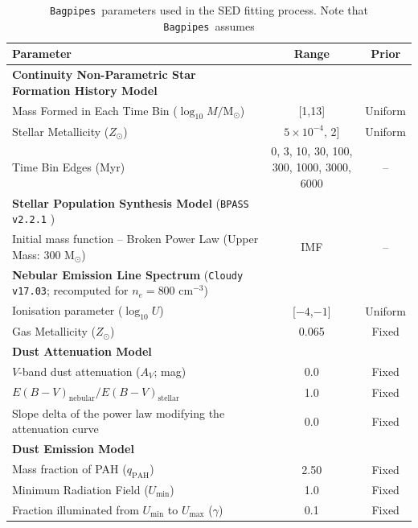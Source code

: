 \documentclass[twocolumn,tight,times,linenumbers]{aastex631}
\newcommand{\msol}{M$_\odot$}
\newcommand{\bagpipes}{\texttt{Bagpipes}}
\begin{document}
		\begin{table}
			\caption{\bagpipes~parameters used in the SED fitting process. Note that \bagpipes~assumes }
			\label{table:bagpipes}
			\centering
			\begin{tabular*}{\textwidth}{@{\extracolsep{\fill}}lcc}
				\hline
				Parameter & Range & Prior \\
				\hline
				\textbf{Continuity Non-Parametric Star Formation History Model} \citep{Leja2019} & & \\
				Mass Formed in Each Time Bin ($\log_{10} M/$M$_\odot$)  & [1,13] & Uniform\\
				Stellar Metallicity ($Z_\odot$)               &	 $5\times10^{-4}$, 2]    & 	Uniform \\
				Time Bin Edges (Myr) & 0, 3, 10, 30, 100, 300, 1000, 3000, 6000 & -- \\
				\hline
				\textbf{Stellar Population Synthesis Model} (\texttt{BPASS v2.2.1} \citealt{Stanway2018})       &                                        &  \\
				Initial mass function -- Broken Power Law (Upper Mass: 300 \msol)			&  IMF          					   & -- \\
				\hline
				\textbf{Nebular Emission Line Spectrum} (\texttt{Cloudy v17.03}; recomputed for $n_e = 800$ cm$^{-3}$) & & \\
				Ionisation parameter ($\log_{10} U$)	              & [$-4$,$-1$] &  Uniform \\		 
				Gas Metallicity ($Z_\odot$)									&   0.065     & Fixed \\
				\hline
				\textbf{Dust Attenuation Model} \citep{Calzetti2000}    &  &\\ 
				$V$-band dust attenuation ($A_V$; mag) & 0.0  & Fixed \\
				$E(B-V)_\mathrm{nebular}/E(B-V)_\mathrm{stellar}$ & 1.0 & Fixed \\
				Slope delta of the power law modifying the attenuation curve &  0.0 & Fixed \\
				\hline
				\textbf{Dust Emission Model} \citep{Draine2014} & & \\
				Mass fraction of PAH ($q_\mathrm{PAH}$)			&  2.50 & Fixed \\
				Minimum Radiation Field ($U_\mathrm{min}$)        &   1.0 & Fixed \\
				Fraction illuminated from $U_\mathrm{min}$ to $U_\mathrm{max}$ ($\gamma$)           &    0.1  & Fixed\\
				\hline
			\end{tabular*}
		\end{table}
		

    	

	
\end{document}

